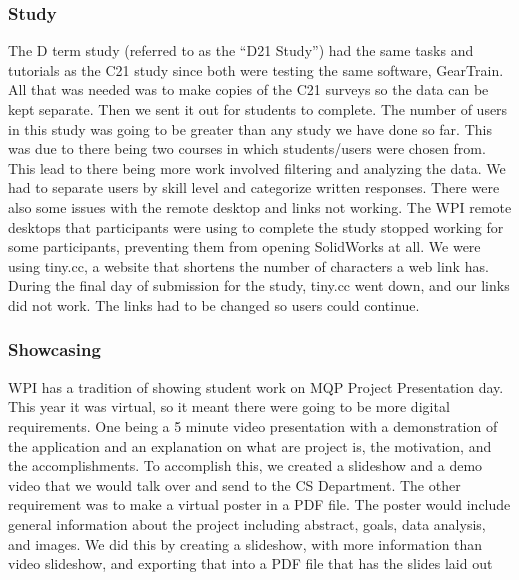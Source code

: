 \begin{doublespace}
\subsubsection{Study}

The D term study (referred to as the ``D21 Study'') had the same tasks and tutorials as the C21 study since both were testing the same software, GearTrain. All that was needed was to make copies of the C21 surveys so the data can be kept separate. Then we sent it out for students to complete. The number of users in this study was going to be greater than any study we have done so far. This was due to there being two courses in which students/users were chosen from. This lead to there being more work involved filtering and analyzing the data. We had to separate users by skill level and categorize written responses. There were also some issues with the remote desktop and links not working. The WPI remote desktops that participants were using to complete the study stopped working for some participants, preventing them from opening SolidWorks at all. We were using tiny.cc, a website that shortens the number of characters a web link has. During the final day of submission for the study, tiny.cc went down, and our links did not work. The links had to be changed so users could continue.

\subsubsection{Showcasing}

WPI has a tradition of showing student work on MQP Project Presentation day. This year it was virtual, so it meant there were going to be more digital requirements. One being a 5 minute video presentation with a demonstration of the application and an explanation on what are project is, the motivation, and the accomplishments. To accomplish this, we created a slideshow and a demo video that we would talk over and send to the CS Department. The other requirement was
to make a virtual poster in a PDF file. The poster would include general information about the project including abstract, goals, data analysis, and images. We did this by creating a slideshow, with more information than video slideshow, and exporting that into a PDF file that has the slides laid out

\end{doublespace}